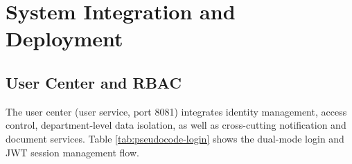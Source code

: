 \section{System Integration and Deployment}

\subsection{User Center and RBAC}

The user center (user service, port 8081) integrates identity management, access control, department-level data isolation, as well as cross-cutting notification and document services. Table \ref{tab:pseudocode-login} shows the dual-mode login and JWT session management flow.

\vspace{3mm}

